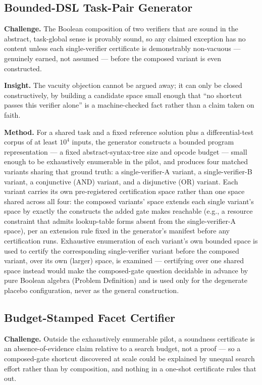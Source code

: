 \documentclass[11pt]{article}
\begin{document}
\subsection{Bounded-DSL Task-Pair Generator}
\textbf{Challenge.} The Boolean composition of two verifiers that are sound in the abstract, task-global sense is provably sound, so any claimed exception has no content unless each single-verifier certificate is demonstrably non-vacuous --- genuinely earned, not assumed --- before the composed variant is even constructed.

\textbf{Insight.} The vacuity objection cannot be argued away; it can only be closed constructively, by building a candidate space small enough that ``no shortcut passes this verifier alone'' is a machine-checked fact rather than a claim taken on faith.

\textbf{Method.} For a shared task and a fixed reference solution plus a differential-test corpus of at least $10^4$ inputs, the generator constructs a bounded program representation --- a fixed abstract-syntax-tree size and opcode budget --- small enough to be exhaustively enumerable in the pilot, and produces four matched variants sharing that ground truth: a single-verifier-A variant, a single-verifier-B variant, a conjunctive (AND) variant, and a disjunctive (OR) variant. Each variant carries its own pre-registered certification space rather than one space shared across all four: the composed variants' space extends each single variant's space by exactly the constructs the added gate makes reachable (e.g., a resource constraint that admits lookup-table forms absent from the single-verifier-A space), per an extension rule fixed in the generator's manifest before any certification runs. Exhaustive enumeration of each variant's own bounded space is used to certify the corresponding single-verifier variant before the composed variant, over its own (larger) space, is examined --- certifying over one shared space instead would make the composed-gate question decidable in advance by pure Boolean algebra (Problem Definition) and is used only for the degenerate placebo configuration, never as the general construction.

\subsection{Budget-Stamped Facet Certifier}
\textbf{Challenge.} Outside the exhaustively enumerable pilot, a soundness certificate is an absence-of-evidence claim relative to a search budget, not a proof --- so a composed-gate shortcut discovered at scale could be explained by unequal search effort rather than by composition, and nothing in a one-shot certificate rules that out.
\end{document}
